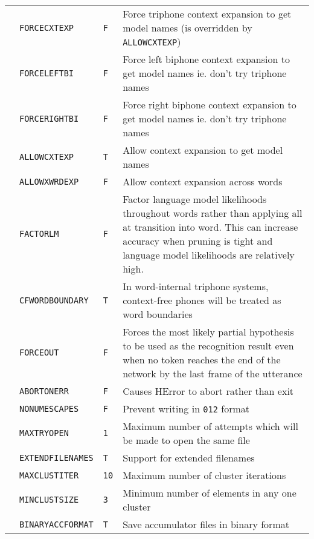 \begin{center}
\begin{supertabular}{|p{1.8cm}|l|l|p{6.6cm}|}
  & \texttt{FORCECXTEXP} & \texttt{F} & Force triphone context expansion to get 
  model names (is overridden by \texttt{ALLOWCXTEXP}) \\ 
  & \texttt{FORCELEFTBI} & \texttt{F} & Force left biphone
  context expansion to get model names ie. don't try triphone names \\ 
  & \texttt{FORCERIGHTBI} & \texttt{F} & Force right biphone
  context expansion to get model names ie. don't try triphone names \\ 
  & \texttt{ALLOWCXTEXP}  & \texttt{T} & Allow context expansion to get model names \\ 
  & \texttt{ALLOWXWRDEXP} & \texttt{F} & Allow context expansion across words \\ 
  & \texttt{FACTORLM}     & \texttt{F} & Factor language model likelihoods throughout words rather 
  than applying all at transition into word. This can increase accuracy when pruning is tight and 
  language model likelihoods are relatively high. \\  
  & \texttt{CFWORDBOUNDARY} & \texttt{T} & In word-internal triphone systems, context-free 
  phones will be treated as word boundaries \\ \hline

  & \texttt{FORCEOUT} & \texttt{F} & Forces the most likely partial hypothesis to be used as
  the recognition result even when no token reaches the end of the network by the last frame
  of the utterance \\ \hline

  & \texttt{ABORTONERR} & \texttt{F} & Causes HError to abort rather than exit \\ 
 & \texttt{NONUMESCAPES} & \texttt{F} & Prevent writing in \verb+012+ format \\ 
  & \texttt{MAXTRYOPEN} & \texttt{1} & Maximum number of
  attempts which will be made to open the same file \\ 
  & \texttt{EXTENDFILENAMES} & \texttt{T} & Support for extended
  filenames \\ \hline


  & \texttt{MAXCLUSTITER} & \texttt{10} & Maximum number
  of cluster iterations \\ 
 & \texttt{MINCLUSTSIZE} & \texttt{3} & Minimum number
  of elements in any one cluster \\ 
  & \texttt{BINARYACCFORMAT} & \texttt{T} & Save
  accumulator files in binary format \\ \hline


\end{supertabular}
\end{center}
